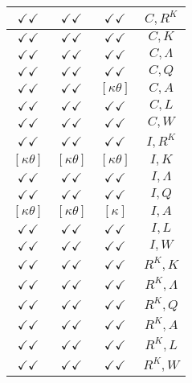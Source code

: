 \documentclass[a4paper,10pt]{article}
\begin{document}
\begin{longtable}{|c|c|c|c|}
\hline
$\checkmark\checkmark$ & $\checkmark\checkmark$ & $\checkmark\checkmark$ & ${C},{R^{K}}$ \\
\hline
$\checkmark\checkmark$ & $\checkmark\checkmark$ & $\checkmark\checkmark$ & ${C},{K}$ \\
\hline
$\checkmark\checkmark$ & $\checkmark\checkmark$ & $\checkmark\checkmark$ & ${C},{\Lambda}$ \\
\hline
$\checkmark\checkmark$ & $\checkmark\checkmark$ & $\checkmark\checkmark$ & ${C},{Q}$ \\
\hline
$\checkmark\checkmark$ & $\checkmark\checkmark$ & $[\kappa \theta ]$ & ${C},{A}$ \\
\hline
$\checkmark\checkmark$ & $\checkmark\checkmark$ & $\checkmark\checkmark$ & ${C},{L}$ \\
\hline
$\checkmark\checkmark$ & $\checkmark\checkmark$ & $\checkmark\checkmark$ & ${C},{W}$ \\
\hline
$\checkmark\checkmark$ & $\checkmark\checkmark$ & $\checkmark\checkmark$ & ${I},{R^{K}}$ \\
\hline
$[\kappa \theta ]$ & $[\kappa \theta ]$ & $[\kappa \theta ]$ & ${I},{K}$ \\
\hline
$\checkmark\checkmark$ & $\checkmark\checkmark$ & $\checkmark\checkmark$ & ${I},{\Lambda}$ \\
\hline
$\checkmark\checkmark$ & $\checkmark\checkmark$ & $\checkmark\checkmark$ & ${I},{Q}$ \\
\hline
$[\kappa \theta ]$ & $[\kappa \theta ]$ & $[\kappa ]$ & ${I},{A}$ \\
\hline
$\checkmark\checkmark$ & $\checkmark\checkmark$ & $\checkmark\checkmark$ & ${I},{L}$ \\
\hline
$\checkmark\checkmark$ & $\checkmark\checkmark$ & $\checkmark\checkmark$ & ${I},{W}$ \\
\hline
$\checkmark\checkmark$ & $\checkmark\checkmark$ & $\checkmark\checkmark$ & ${R^{K}},{K}$ \\
\hline
$\checkmark\checkmark$ & $\checkmark\checkmark$ & $\checkmark\checkmark$ & ${R^{K}},{\Lambda}$ \\
\hline
$\checkmark\checkmark$ & $\checkmark\checkmark$ & $\checkmark\checkmark$ & ${R^{K}},{Q}$ \\
\hline
$\checkmark\checkmark$ & $\checkmark\checkmark$ & $\checkmark\checkmark$ & ${R^{K}},{A}$ \\
\hline
$\checkmark\checkmark$ & $\checkmark\checkmark$ & $\checkmark\checkmark$ & ${R^{K}},{L}$ \\
\hline
$\checkmark\checkmark$ & $\checkmark\checkmark$ & $\checkmark\checkmark$ & ${R^{K}},{W}$ \\

\end{longtable}
\end{document}
